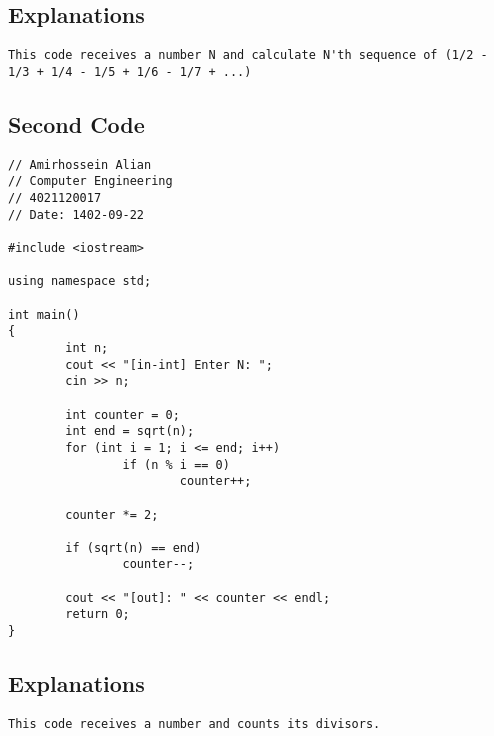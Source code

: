 \documentclass[12pt]{article}
\begin{document}
 	\subsection{Explanations}
    \begin{tcolorbox}[breakable, size=fbox, boxrule=1pt, pad at break*=1mm, colback=cellbackground, colframe=cellborder]
\begin{Verbatim}[commandchars=\\\{\}]
This code receives a number N and calculate N'th sequence of (1/2 - 1/3 + 1/4 - 1/5 + 1/6 - 1/7 + ...)
\end{Verbatim}
\end{tcolorbox}

        \subsection{Second Code}
   \begin{tcolorbox}[breakable, size=fbox, boxrule=1pt, pad at break*=1mm, colback=cellbackground, colframe=cellborder]
\begin{verbatim}
// Amirhossein Alian
// Computer Engineering
// 4021120017
// Date: 1402-09-22

#include <iostream>

using namespace std;

int main()
{
        int n;
        cout << "[in-int] Enter N: ";
        cin >> n;

        int counter = 0;
        int end = sqrt(n);
        for (int i = 1; i <= end; i++)
                if (n % i == 0)
                        counter++;
        
        counter *= 2;
        
        if (sqrt(n) == end)
                counter--;

        cout << "[out]: " << counter << endl;
        return 0;
}
\end{verbatim}
\end{tcolorbox}

 	\subsection{Explanations}
    \begin{tcolorbox}[breakable, size=fbox, boxrule=1pt, pad at break*=1mm, colback=cellbackground, colframe=cellborder]
\begin{Verbatim}[commandchars=\\\{\}]
This code receives a number and counts its divisors.
\end{Verbatim}
\end{tcolorbox}
\end{document}
